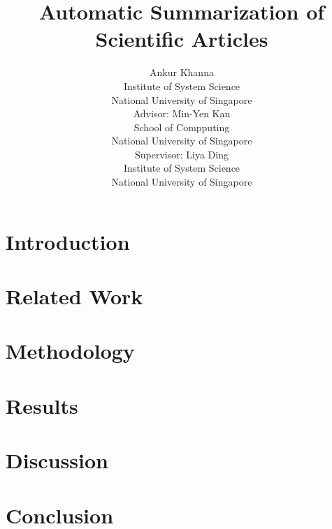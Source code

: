 \documentclass[12pt]{scrreprt}
\title{Automatic Summarization of Scientific Articles}
\author{Ankur Khanna \\
  Institute of System Science\\
  National University of Singapore\\
Advisor:
  Min-Yen Kan \\
  School of Compputing\\
  National University of Singapore\\
Supervisor:
  Liya Ding\\
  Institute of System Science\\
  National University of Singapore\\}
\date{}
\begin{document}
\maketitle

\tableofcontents

\begin{abstract}

\end{abstract}

\chapter{Introduction}
\label{section:introduction}


\chapter{Related Work}
\label{section:related work}


\chapter{Methodology}
\label{section: method}


\chapter{Results}
\label{section:experiments}


\chapter{Discussion}
\label{section:discussion}


\chapter{Conclusion}
\label{section:conclusion}




\end{document}

